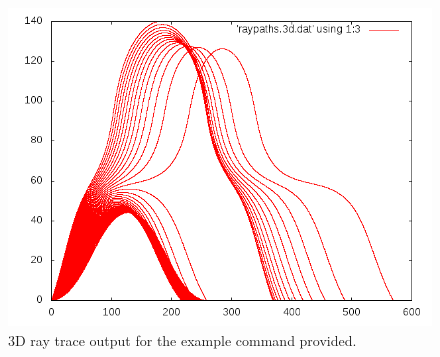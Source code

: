 \begin{figure}
\begin{center}
\includegraphics[scale=0.45]{figs/raytrace3d}
\end{center}
\caption{3D ray trace output for the example command provided.}
\label{fig:RT3D}
\end{figure}
 
